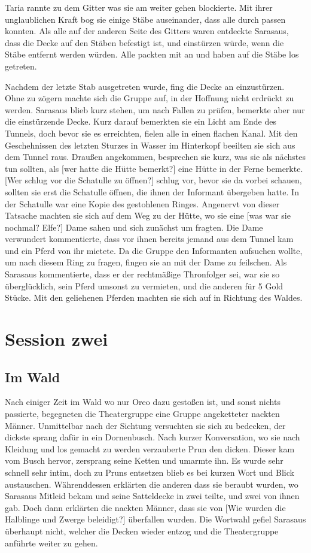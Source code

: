 \documentclass[10pt,twoside,twocolumn,openany]{book}
\begin{document}
	Taria rannte zu dem Gitter was sie am weiter gehen blockierte. Mit ihrer unglaublichen Kraft bog sie einige Stäbe auseinander, dass alle durch passen konnten. Als alle auf der anderen Seite des Gitters waren entdeckte Sarasaus, dass die Decke auf den Stäben befestigt ist, und einstürzen würde, wenn die Stäbe entfernt werden würden. Alle packten mit an und haben auf die Stäbe los getreten.

	Nachdem der letzte Stab ausgetreten wurde, fing die Decke an einzustürzen. Ohne zu zögern machte sich die Gruppe auf, in der Hoffnung nicht erdrückt zu werden. Sarasaus blieb kurz stehen, um nach Fallen zu prüfen, bemerkte aber nur die einstürzende Decke. Kurz darauf bemerkten sie ein Licht am Ende des Tunnels, doch bevor sie es erreichten, fielen alle in einen flachen Kanal. Mit den Geschehnissen des letzten Sturzes in Wasser im Hinterkopf beeilten sie sich aus dem Tunnel raus. Draußen angekommen, besprechen sie kurz, was sie als nächstes tun sollten, als [wer hatte die Hütte bemerkt?] eine Hütte in der Ferne bemerkte. [Wer schlug vor die Schatulle zu öffnen?] schlug vor, bevor sie da vorbei schauen, sollten sie erst die Schatulle öffnen, die ihnen der Informant übergeben hatte. In der Schatulle war eine Kopie des gestohlenen Ringes. Angenervt von dieser Tatsache machten sie sich auf dem Weg zu der Hütte, wo sie eine [was war sie nochmal? Elfe?] Dame sahen und sich zunächst um fragten. Die Dame verwundert kommentierte, dass vor ihnen bereits jemand aus dem Tunnel kam und ein Pferd von ihr mietete. Da die Gruppe den Informanten aufsuchen wollte, um nach diesem Ring zu fragen, fingen sie an mit der Dame zu feilschen. Als Sarasaus kommentierte, dass er der rechtmäßige Thronfolger sei, war sie so überglücklich, sein Pferd umsonst zu vermieten, und die anderen für 5 Gold Stücke. Mit den geliehenen Pferden machten sie sich auf in Richtung des Waldes.
	
	\chapter{Session zwei}
	
	\section{Im Wald}
	
	Nach einiger Zeit im Wald wo nur Oreo dazu gestoßen ist, und sonst nichts passierte, begegneten die Theatergruppe eine Gruppe angeketteter nackten Männer. Unmittelbar nach der Sichtung versuchten sie sich zu bedecken, der dickste sprang dafür in ein Dornenbusch. Nach kurzer Konversation, wo sie nach Kleidung und los gemacht zu werden verzauberte Prun den dicken. Dieser kam vom Busch hervor, zersprang seine Ketten und umarmte ihn. Es wurde sehr schnell sehr intim, doch zu Pruns entsetzen blieb es bei kurzen Wort und Blick austauschen. Währenddessen erklärten die anderen dass sie beraubt wurden, wo Sarasaus Mitleid bekam und seine Satteldecke in zwei teilte, und zwei von ihnen gab. Doch dann erklärten die nackten Männer, dass sie von [Wie wurden die Halblinge und Zwerge beleidigt?] überfallen wurden. Die Wortwahl gefiel Sarasaus überhaupt nicht, welcher die Decken wieder entzog und die Theatergruppe anführte weiter zu gehen. 
	
\end{document}
